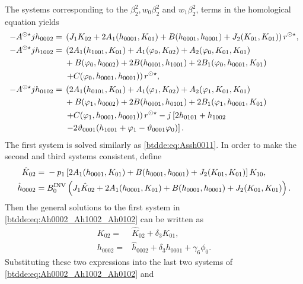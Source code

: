 The systems corresponding to the $\beta_2^2, w_0\beta_2^2$ and $w_1\beta_2^2$,
terms in the homological equation yields
\begin{equation}
\label{btdde:eq:Ah0002_Ah1002_Ah0102}
\begin{aligned}
-A^{\odot\star} jh_{0002}={}&  \left(J_1K_{02} + 2A_1(h_{0001},K_{01})
							 + B(h_{0001},h_{0001}) + J_2(K_{01},K_{01})\right)r^{\odot\star}, \\
-A^{\odot\star} jh_{1002}={}& \left( 2A_1(h_{1001},K_{01}) + A_1(\varphi_0,K_{02}) + A_2(\varphi_0,K_{01},K_{01}) \right.
					 \\ & + B(\varphi_0,h_{0002}) + 2B(h_{0001},h_{1001}) +
					 2B_1(\varphi_0,h_{0001},K_{01}) \\
  & \left. + C(\varphi_0,h_{0001},h_{0001}) \right)r^{\odot\star}, \\
-A^{\odot\star} jh_{0102}={}& \left( 2A_1(h_{0101},K_{01}) + A_1(\varphi_1,K_{02}) + A_2(\varphi_1,K_{01},K_{01}) \right. \\
  & + B(\varphi_1,h_{0002}) + 2B(h_{0001},h_{0101}) + 2B_1(\varphi_1,h_{0001},K_{01}) \\
  & \left. + C(\varphi_1,h_{0001},h_{0001})\right)r^{\odot\star} -j \left[ 2h_{0101} + h_{1002} \right. \\
  & \left. -2\vartheta_{0001} (h_{1001} + \varphi_1 - \vartheta_{0001}\varphi_0) \right].
\end{aligned}
\end{equation}
The first system is solved similarly as \cref{btdde:eq:Assh0011}. In order to make the second and third systems
consistent, define
\begin{equation*}
\begin{aligned}
\hat K_{02}={}&-p_1\left[2A_1(h_{0001},K_{01}) + B(h_{0001},h_{0001})
				+J_2(K_{01},K_{01})\right]K_{10}, \\
                \hat h_{0002} ={}& B^{\mathrm{INV}}_{0} \left( J_1 \hat K_{02} + 2A_1(h_{0001},K_{01})
                + B(h_{0001},h_{0001}) + J_2(K_{01},K_{01})\right).
\end{aligned}
\end{equation*}
Then the general solutions to the first system in \cref{btdde:eq:Ah0002_Ah1002_Ah0102}
can be written as
\begin{equation*}
\begin{aligned}
				K_{02}={}& \hat K_{02} + \delta_3 K_{01}, \\
				h_{0002}={}& \hat h_{0002} +  \delta_3 h_{0001} + \gamma_6 \phi_0.
\end{aligned}
\end{equation*}
Substituting these two expressions into the last two systems of \cref{btdde:eq:Ah0002_Ah1002_Ah0102} and
